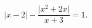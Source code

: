 \begin{ex}[type=equation]
	\begin{condition}
		$\big|x - 2\big| - \dfrac{\big|x^2 + 2x\big|}{x + 3}= 1.$
	\end{condition}
\end{ex}
